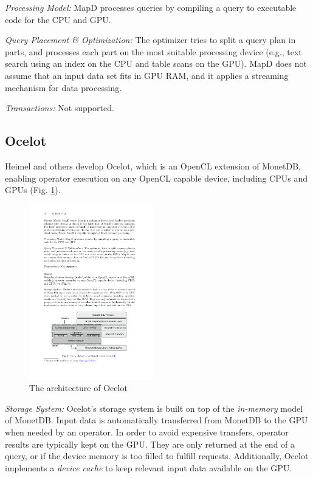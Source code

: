 \documentclass[twocolumn]{article}
\begin{document}
\noindent
\textit{Processing Model:} 
MapD processes queries by compiling a query to executable code for the CPU and GPU.

\noindent
\textit{Query Placement \& Optimization:} 
The optimizer tries to split a query plan in parts, and processes each part on the most suitable processing device (e.g., text search using an index on the CPU and table scans on the GPU). MapD does not assume that an input data set fits in GPU RAM, and it applies a streaming mechanism for data processing.

\noindent
\textit{Transactions:} Not supported.

\subsection{Ocelot}
Heimel and others develop Ocelot, which is an OpenCL extension of MonetDB, enabling operator execution on any OpenCL capable device, including CPUs and GPUs (Fig. \ref{fig:ocelot}).
\begin{figure}[htb]
        \centering
        \includegraphics[width=0.48\textwidth]{ocelot.pdf}
        \caption{The architecture of Ocelot}
        \label{fig:ocelot}
\end{figure}

\noindent
\textit{Storage System:} 
Ocelot’s storage system is built on top of the \textit{in-memory} model of MonetDB. Input data is automatically transferred from MonetDB to the GPU when needed by an operator. In order to avoid expensive transfers, operator results are typically kept on the GPU. They are only returned at the end of a query, or if the device memory is too filled to fulfill requests. Additionally, Ocelot implements a \textit{device cache} to keep relevant input data available on the GPU.
\end{document}

